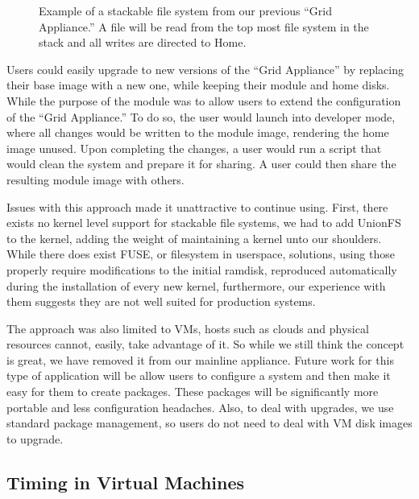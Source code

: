 \documentclass[conference]{IEEEtran}
\begin{document}
\begin{figure}[ht]
\centering
{}
\caption{Example of a stackable file system from our previous ``Grid
Appliance.''  A file will be read from the top most file system in the stack
and all writes are directed to Home.}
\label{fig:stackfs}
\end{figure}

Users could easily upgrade to new versions of the ``Grid Appliance'' by
replacing their base image with a new one, while keeping their module and home
disks.  While the purpose of the module was to allow users to extend the
configuration of the ``Grid Appliance.''  To do so, the user would launch into
developer mode, where all changes would be written to the module image,
rendering the home image unused.  Upon completing the changes, a user would run
a script that would clean the system and prepare it for sharing.  A user could
then share the resulting module image with others.

Issues with this approach made it unattractive to continue using.  First, there
exists no kernel level support for stackable file systems, we had to add
UnionFS~\cite{unionfs} to the kernel, adding the weight of maintaining a kernel
unto our shoulders.  While there does exist FUSE, or filesystem in userspace,
solutions, using those properly require modifications to the initial ramdisk,
reproduced automatically during the installation of every new kernel,
furthermore, our experience with them suggests they are not well suited for
production systems.

The approach was also limited to VMs, hosts such as clouds and physical
resources cannot, easily, take advantage of it.  So while we still think the
concept is great, we have removed it from our mainline appliance.  Future work
for this type of application will be allow users to configure a system and then
make it easy for them to create packages.  These packages will be significantly
more portable and less configuration headaches.  Also, to deal with upgrades,
we use standard package management, so users do not need to deal with VM disk
images to upgrade.

\subsection{Timing in Virtual Machines}
\end{document}
